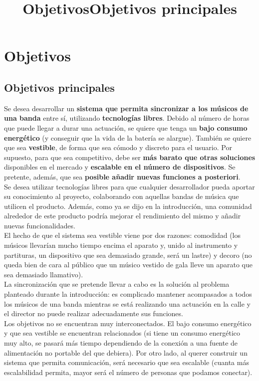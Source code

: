 \chapter{Objetivos}
\title{Objetivos}

\title{Objetivos principales}
\section{
Objetivos principales
}
Se desea desarrollar un \textbf{sistema que permita sincronizar a los músicos de una banda} entre sí,
utilizando \textbf{tecnologías libres}. Debido al número de horas que puede llegar a durar una
actuación, se quiere que tenga un \textbf{bajo consumo energético} (y conseguir que la vida de la batería se alargue).
También se quiere que sea
\textbf{vestible}, de forma que sea cómodo y discreto para el usuario. Por supuesto, para que
sea competitivo, debe ser \textbf{más barato que otras soluciones} disponibles en el mercado y
\textbf{escalable en el número de dispositivos}. Se pretente, además, que sea \textbf{posible añadir nuevas
funciones a posteriori}.\\

Se desea utilizar tecnologías libres para que cualquier desarrollador pueda aportar su conocimiento al proyecto, colaborando
con aquellas bandas de música que utilicen el producto. Además, como ya se dijo en la introducción,
una comunidad alrededor de este producto podría mejorar el rendimiento del mismo y añadir nuevas funcionalidades.\\

El hecho de que el sistema sea vestible viene por dos razones: comodidad (los músicos llevarían mucho tiempo encima el aparato y,
unido al instrumento y partituras, un dispositivo que sea demasiado grande, será un lastre) y decoro (no queda bien de cara al público que
un músico vestido de gala lleve un aparato que sea demasiado llamativo).\\

La sincronización que se pretende llevar a cabo es la solución al problema planteado durante la introducción: es complicado
mantener acompasados a todos los músicos de una banda mientras se está realizando una actuación en la calle y el director no puede
realizar adecuadamente sus funciones.\\

Los objetivos no se encuentran muy interconectados. El bajo consumo energético y que sea vestible se encuentran
relacionados (si tiene un consumo energético muy alto, se pasará más tiempo dependiendo de la conexión a una fuente
de alimentación no portable del que debiera). Por otro lado, al querer construir un sistema que permita comunicación,
será necesario que sea escalable (cuanta más escalabilidad permita, mayor será el número de personas que podamos conectar).

